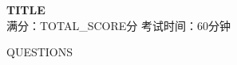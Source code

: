 \documentclass[12pt,a4paper]{article}
\begin{document}
\begin{center}
\LARGE{\textbf{{TITLE}}}\\[0.3cm]
\large{满分：{TOTAL_SCORE}分 \quad 考试时间：60分钟}
\end{center}
\vspace{0.5cm}
{QUESTIONS}
\end{document}
